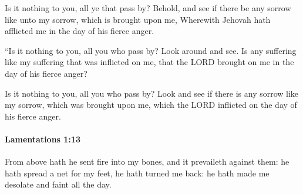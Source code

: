 			\begin{versebox}
					\item[BHS] 
					\item[LXX] 
					\item[ASV] Is it nothing to you, all ye that pass by? Behold, and see if there be any sorrow like unto my sorrow, which is brought upon me, Wherewith Jehovah hath afflicted me in the day of his fierce anger.
					\item[NIV] “Is it nothing to you, all you who pass by? Look around and see. Is any suffering like my suffering that was inflicted on me, that the LORD brought on me in the day of his fierce anger?
					\item[NRSV] Is it nothing to you, all you who pass by? Look and see if there is any sorrow like my sorrow, which was brought upon me, which the LORD inflicted on the day of his fierce anger.
			\end{versebox}

		\paragraph{Lamentations 1:13} %
			\label{LAMENTATIONS-1-13}

			From above hath he sent fire into my bones, and it prevaileth against them: he hath spread a net for my feet, he hath turned me back: he hath made me desolate and faint all the day.

